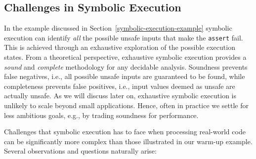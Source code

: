 
\subsection{Challenges in Symbolic Execution}
\label{example-discussion}

In the example discussed in Section~\ref{symbolic-execution-example} symbolic execution can identify {\em all} the possible unsafe inputs that make the {\tt assert} fail. This is achieved through an exhaustive exploration of the possible execution states. From a theoretical perspective, exhaustive symbolic execution provides a {\em sound} and {\em complete} methodology for any decidable analysis. Soundness prevents false negatives, i.e., all possible unsafe inputs are guaranteed to be found, while completeness prevents false positives, i.e.,  input values deemed as unsafe are actually unsafe. As we will discuss later on, exhaustive symbolic execution is unlikely to scale beyond small applications. Hence, often in practice we settle for less ambitious goals, e.g., by trading soundness for performance.

Challenges that symbolic execution has to face when processing real-world code can be significantly more complex than those illustrated in our warm-up example. Several observations and questions naturally arise:

